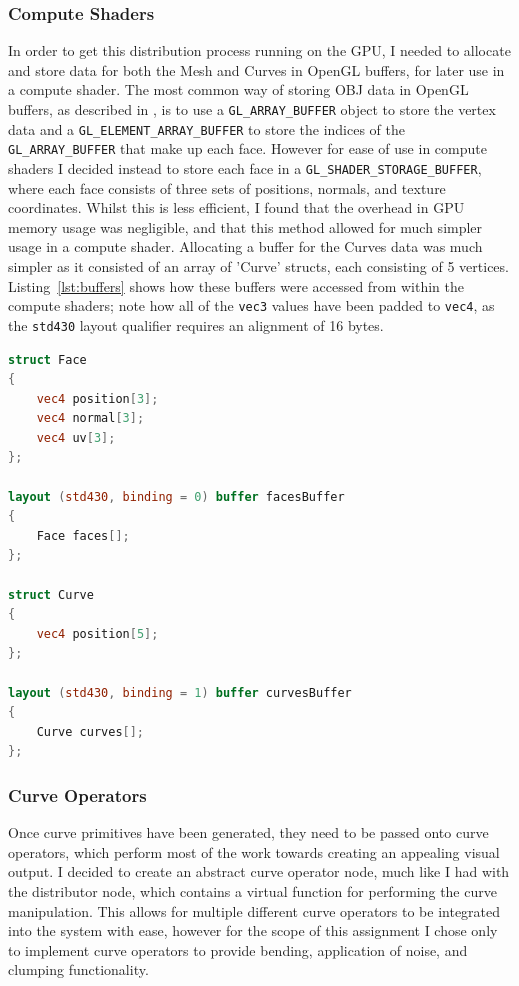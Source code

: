 \documentclass[]{acmsiggraph}
\begin{document}
\subsubsection{Compute Shaders} \label{sec:compute shaders}

In order to get this distribution process running on the GPU, I needed to allocate and store data for both the Mesh and Curves in OpenGL buffers, for later use in a compute shader. The most common way of storing OBJ data in OpenGL buffers, as described in \cite{objLoading}, is to use a \verb|GL_ARRAY_BUFFER| object to store the vertex data and a \verb|GL_ELEMENT_ARRAY_BUFFER| to store the indices of the \verb|GL_ARRAY_BUFFER| that make up each face. However for ease of use in compute shaders I decided instead to store each face in a \verb|GL_SHADER_STORAGE_BUFFER|, where each face consists of three sets of positions, normals, and texture coordinates. Whilst this is less efficient, I found that the overhead in GPU memory usage was negligible, and that this method allowed for much simpler usage in a compute shader. Allocating a buffer for the Curves data was much simpler as it consisted of an array of 'Curve' structs, each consisting of 5 vertices. Listing~\ref{lst:buffers} shows how these buffers were accessed from within the compute shaders; note how all of the \texttt{vec3} values have been padded to \texttt{vec4}, as the \texttt{std430} layout qualifier requires an alignment of 16 bytes.

\begin{lstlisting}[language=GLSL, label={lst:buffers}, caption={Extract from the Distributor compute shader, showing how the Mesh and Curves buffers are accessed.}]
struct Face
{
	vec4 position[3];
	vec4 normal[3];
	vec4 uv[3];
};

layout (std430, binding = 0) buffer facesBuffer
{
	Face faces[];
};

struct Curve
{
	vec4 position[5];
};

layout (std430, binding = 1) buffer curvesBuffer
{
	Curve curves[];
};
\end{lstlisting}

\subsubsection{Curve Operators} \label{sec:operators}

Once curve primitives have been generated, they need to be passed onto curve operators, which perform most of the work towards creating an appealing visual output. I decided to create an abstract curve operator node, much like I had with the distributor node, which contains a virtual function for performing the curve manipulation. This allows for multiple different curve operators to be integrated into the system with ease, however for the scope of this assignment I chose only to implement curve operators to provide bending, application of noise, and clumping functionality.
\end{document}
